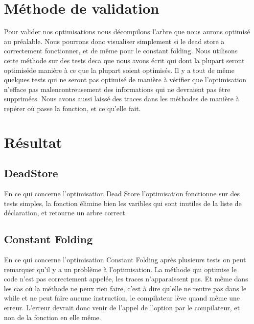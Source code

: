 \documentclass[a4paper]{article}
\begin{document}
\section{Méthode de validation}
Pour valider nos optimisations nous décompilons l'arbre que nous aurons optimisé au préalable. Nous pourrons donc visualiser simplement si le dead store a correctement fonctionner, et de même pour le constant folding. Nous utilisons cette méthode sur des tests deca que nous avons écrit qui dont la plupart seront optimiséde manière à ce que la plupart soient optimisés. Il y a tout de même quelques tests qui ne seront pas optimisé de manière à vérifier que l'optimisation n'efface pas malencontreusement des informations qui ne devraient pas être supprimées. Nous avons aussi laissé des traces dans les méthodes de manière à repérer où passe la fonction, et ce qu'elle fait.
\section{Résultat}
\subsection{DeadStore}
En ce qui concerne l'optimisation Dead Store l'optimisation fonctionne sur des tests simples, la fonction élimine bien les varibles qui sont inutiles de la liste de déclaration, et retourne un arbre correct.
\subsection{Constant Folding}
En ce qui concerne l'optimisation Constant Folding après plusieurs tests on peut remarquer qu'il y a un problème à l'optimisation. La méthode qui optimise le code n'est pas correctement appelée, les traces n'apparaissent pas. Et même dans les cas où la méthode ne peux rien faire, c'est à dire qu'elle ne rentre pas dans le while et ne peut faire aucune instruction, le compilateur lève quand même une erreur. L'erreur devrait donc venir de l'appel de l'option par le compilateur, et non de la fonction en elle même. 
\end{document}
